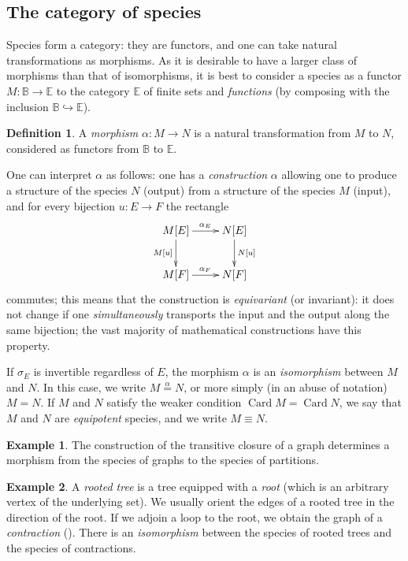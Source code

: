 \documentclass{article}
\theoremstyle{definition}
\newtheorem{defn}[thm]{Definition}
\newtheorem{ex}{Example}
\theoremstyle{remark}
\newcommand{\B}{\mathbb{B}}
\newcommand{\E}{\mathbb{E}}
\newcommand{\inj}{\hookrightarrow}
\DeclareMathOperator{\Card}{Card}
\newcommand{\pref}[1]{\prettyref{#1}}
\begin{document}
\subsection{The category of species}
\label{sec:category-of-species}

Species form a category: they are functors, and one can take natural
transformations as morphisms. As it is desirable to have a larger
class of morphisms than that of isomorphisms, it is best to consider a
species as a functor $M: \B \to \E$ to the category $\E$ of finite
sets and \emph{functions} (by composing with the inclusion $\B \inj
\E$).

\begin{defn}
  A \emph{morphism} $\alpha : M \to N$ is a natural transformation
  from $M$ to $N$, considered as functors from $\B$ to $\E$.
\end{defn}

One can interpret $\alpha$ as follows: one has a \emph{construction}
$\alpha$ allowing one to produce a structure of the species $N$
(output) from a structure of the species $M$ (input), and for every
bijection $u : E \to F$ the rectangle \[ \xymatrix{M[E]
  \ar[r]^{\alpha_E} \ar[d]_{M[u]} & N[E] \ar[d]^{N[u]} \\ M[F]
  \ar[r]^{\alpha_F} & N[F] } \] commutes; this means that the
construction is \emph{equivariant} (or invariant): it does not change
if one \emph{simultaneously} transports the input and the output along
the same bijection; the vast majority of mathematical constructions
have this property.

If $\sigma_E$ is invertible regardless of $E$, the morphism $\alpha$
is an \emph{isomorphism} between $M$ and $N$. In this case, we write
$M \stackrel{\alpha}{=} N$, or more simply (in an abuse of notation) $M
= N$. If $M$ and $N$ satisfy the weaker condition $\Card M = \Card N$,
we say that $M$ and $N$ are \emph{equipotent} species, and we write $M
\equiv N$.

\begin{ex}
  The construction of the transitive closure of a graph determines a
  morphism from the species of graphs to the species of partitions.
\end{ex}

\begin{ex}
  A \emph{rooted tree} is a tree equipped with a \emph{root} (which is
  an arbitrary vertex of the underlying set). We usually orient the
  edges of a rooted tree in the direction of the root. If we adjoin a
  loop to the root, we obtain the graph of a \emph{contraction}
  (\pref{ex:endofunctions}). There is an \emph{isomorphism} between
  the species of rooted trees and the species of contractions.
\end{ex}
\end{document}
